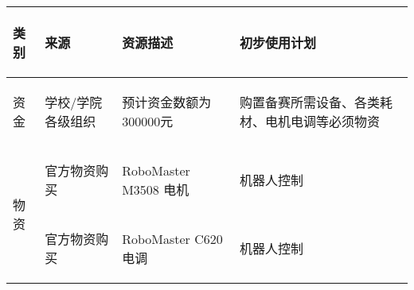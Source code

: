 \begin{longtable}{ X | X | X | X }

    \hline

    \endfoot
    
    \rowcolor{tabhdcolor}
    
        \begin{center}
            类别
        \end{center} &
        \begin{center}
            来源
        \end{center} &
        \begin{center}
            资源描述
        \end{center} &
        \begin{center}
            初步使用计划
        \end{center} \\
    
    \hline
    
    \endhead
    
        \begin{center}
            资金
        \end{center} &
        \begin{center}
            学校/学院各级组织
        \end{center} &
        \begin{center}
            预计资金数额为300000元
        \end{center} &
        \begin{center}
            购置备赛所需设备、各类耗材、电机电调等必须物资
        \end{center}\\
    
    \hline
    
        \multirow{15}{*}{物资} &
        \begin{center}
            官方物资购买
        \end{center}&
        \begin{center}
            RoboMaster M3508 电机
        \end{center}&
        \begin{center}
            机器人控制
        \end{center}\\

    \cline{2-4}
    
         &
        \begin{center}
            官方物资购买
        \end{center}&
        \begin{center}
            RoboMaster C620 电调
        \end{center}&
        \begin{center}
            机器人控制
        \end{center}\\


\end{longtable}
